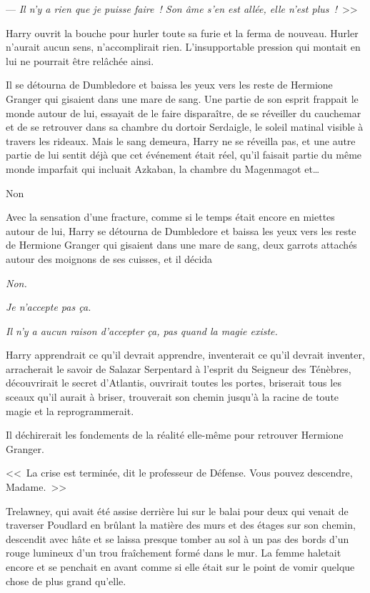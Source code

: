 --- \emph{Il n'y a rien que je puisse faire~! Son âme s'en est allée, elle n'est plus~!}~>>

Harry ouvrit la bouche pour hurler toute sa furie et la ferma de nouveau. Hurler n'aurait aucun sens, n'accomplirait rien. L'insupportable pression qui montait en lui ne pourrait être relâchée ainsi.

Il se détourna de Dumbledore et baissa les yeux vers les reste de Hermione Granger qui gisaient dans une mare de sang. Une partie de son esprit frappait le monde autour de lui, essayait de le faire disparaître, de se réveiller du cauchemar et de se retrouver dans sa chambre du dortoir Serdaigle, le soleil matinal visible à travers les rideaux. Mais le sang demeura, Harry ne se réveilla pas, et une autre partie de lui sentit déjà que cet événement était réel, qu'il faisait partie du même monde imparfait qui incluait Azkaban, la chambre du Magenmagot et…

Non

Avec la sensation d'une fracture, comme si le temps était encore en miettes autour de lui, Harry se détourna de Dumbledore et baissa les yeux vers les reste de Hermione Granger qui gisaient dans une mare de sang, deux garrots attachés autour des moignons de ses cuisses, et il décida

\emph{Non.}

\emph{Je n'accepte pas ça.}

\emph{Il n'y a aucun raison d'accepter ça, pas quand la magie existe.}

Harry apprendrait ce qu'il devrait apprendre, inventerait ce qu'il devrait inventer, arracherait le savoir de Salazar Serpentard à l'esprit du Seigneur des Ténèbres, découvrirait le secret d'Atlantis, ouvrirait toutes les portes, briserait tous les sceaux qu'il aurait à briser, trouverait son chemin jusqu'à la racine de toute magie et la reprogrammerait.

Il déchirerait les fondements de la réalité elle-même pour retrouver Hermione Granger.

\later

<<~La crise est terminée, dit le professeur de Défense. Vous pouvez descendre, Madame.~>>

Trelawney, qui avait été assise derrière lui sur le balai pour deux qui venait de traverser Poudlard en brûlant la matière des murs et des étages sur son chemin, descendit avec hâte et se laissa presque tomber au sol à un pas des bords d'un rouge lumineux d'un trou fraîchement formé dans le mur. La femme haletait encore et se penchait en avant comme si elle était sur le point de vomir quelque chose de plus grand qu'elle.

